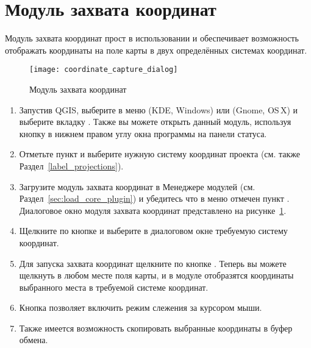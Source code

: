 
\section{Модуль захвата координат}\label{coordcapt}


Модуль захвата координат прост в использовании и обеспечивает возможность
отображать координаты на поле карты в двух определённых системах координат.

\begin{figure}[ht]
   \centering
   \texttt{[image: coordinate\_capture\_dialog]}
   \caption{Модуль захвата координат \wincaption}\label{fig:coordinate_capture_dialog}
\end{figure}

\begin{enumerate}
  \item Запустив QGIS, выберите  в меню
   (KDE, Windows) или  (Gnome, OS\,X)
  и выберите вкладку . Также вы можете открыть данный модуль,
  используя кнопку 
  в нижнем правом углу окна программы на панели статуса.
  \item Отметьте пункт 
  и выберите нужную систему координат проекта (см. также Раздел~\ref{label_projections}).
  \item Загрузите модуль захвата координат в Менеджере модулей (см. Раздел~\ref{sec:load_core_plugin})
  и убедитесь что в меню  \arrow {}
  отмечен пункт .
  Диалоговое окно модуля захвата координат представлено на
  рисунке~\ref{fig:coordinate_capture_dialog}.
  \item Щелкните по кнопке  и выберите в диалоговом окне
  требуемую систему координат.
  \item Для запуска захвата координат щелкните по кнопке .
  Теперь вы можете щелкнуть в любом месте поля карты, и в модуле отобразятся
  координаты выбранного места в требуемой системе координат.
  \item Кнопка  позволяет включить
  режим слежения за курсором мыши.
  \item Также имеется возможность скопировать выбранные координаты в буфер обмена.
\end{enumerate}

\FloatBarrier
